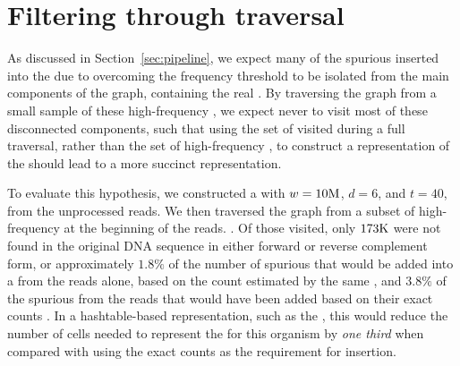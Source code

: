 \section{Filtering through traversal}
\label{sec:results-dbcm-traversal}

As discussed in Section~\ref{sec:pipeline}, we expect many of the spurious  inserted into the \dBG due to overcoming the frequency threshold to be isolated from the main components of the graph, containing the real . By traversing the graph from a small sample of these high-frequency , we expect never to visit most of these disconnected components, such that using the set of  visited during a full traversal, rather than the set of high-frequency , to construct a representation of the \dBG should lead to  a more succinct representation.

To evaluate this hypothesis, we constructed a \dBCM with $w = 10\mega$, $d = 6$, and $t = 40$, from the unprocessed reads. We then traversed the graph from a subset of high-frequency  at the beginning of the reads. . Of those visited, only $173\kilo$ were not found in the original DNA sequence in either forward or reverse complement form, or approximately $1.8\%$ of the number of spurious  that would be added into a \dBG from the reads alone, based on the count estimated by the same \dBCM, and $3.8\%$ of the spurious  from the reads that would have been added based on their exact counts . In a hashtable-based representation, such as the \dBHT, this would reduce the number of cells needed to represent the \dBG for this organism by \emph{one third} when compared with using the exact counts as the requirement for insertion.


